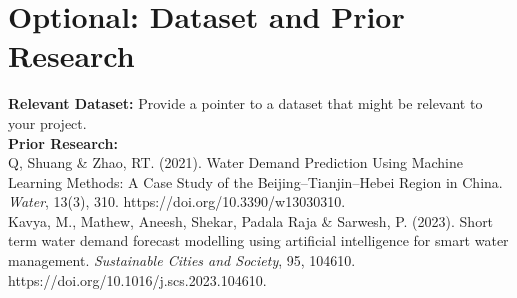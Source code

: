 \documentclass[12pt]{article}
\begin{document}
\section*{Optional: Dataset and Prior Research}
\textbf{Relevant Dataset:} Provide a pointer to a dataset that might be relevant to your project. \\
\textbf{Prior Research:} \\
Q, Shuang \& Zhao, RT. (2021). Water Demand Prediction Using Machine Learning Methods: A Case Study of the Beijing–Tianjin–Hebei Region in China. \textit{Water}, 13(3), 310. https://doi.org/10.3390/w13030310.\\


Kavya, M., Mathew, Aneesh, Shekar, Padala Raja & Sarwesh, P. (2023). Short term water demand forecast modelling using artificial intelligence for smart water management. \textit{Sustainable Cities and Society}, 95, 104610. https://doi.org/10.1016/j.scs.2023.104610.
\end{document}
